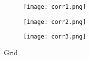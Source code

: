 \documentclass[12pt]{article}
\begin{document}
\begin{figure}[b]
    \centering
    \begin{subfigure}{.5\textwidth}
        \centering
        \texttt{[image: corr1.png]}
    \end{subfigure}%
    \begin{subfigure}{.5\textwidth}
        \centering
        \texttt{[image: corr2.png]}
    \end{subfigure}
    \begin{subfigure}{.5\textwidth}
        \centering
        \texttt{[image: corr3.png]}
    \end{subfigure}%
    \caption[short]{Grid}
    \end{figure}
    
\end{document}
